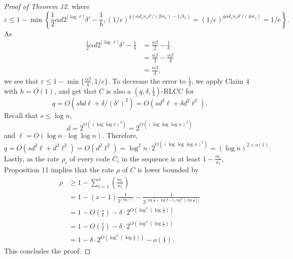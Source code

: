 \begin{proof}[Proof of Theorem 12]
where
\[\varepsilon\le1-\min\left\{\frac12\alpha d2^{\lceil\log\ell\rceil}\delta'-\frac1b,(1/e)^{g(\alpha d_s n_s\delta'/(2m_s)-1/b_s)}=(1/e)^{g\alpha d_s n_s\delta'/(4m_s)}=1/e\right\}.\]
As
\begin{align*}\frac12\alpha d2^{\lceil\log\ell\rceil}\delta'-\frac1b&=\frac{\alpha\beta}2-\frac1b\\&=\frac{\alpha\beta}2-\frac{\alpha\beta}4\\&=\frac{\alpha\beta}4,\end{align*}
we see that $\varepsilon\le1-\min\{\frac{\alpha\beta}4,1/e\}$. To decrease the error to $\frac13$, we apply Claim 4 with $h=O(1)$, and get that $C$ is also a $(q,\delta,\frac13)$-RLCC for
\[q=O(sbd\ell+\delta/(\delta')^2)=O(sd^2\ell+\delta d^2\ell^2).\]
Recall that $s\le\log n$,
\[d=2^{O((\log\log r)^3)}=2^{O((\log\log\log n)^3)}\]
and $\ell=O(\log n\cdot\log\log n)$. Therefore,
\[q=O(sd^2\ell+d^2\ell^2)=O(d^2\ell^2)=\log^2 n\cdot2^{O((\log\log\log n)^3)}=(\log n)^{2+o(1)}.\]
Lastly, as the rate $\rho_i$ of every code $C_i$ in the sequence is at least $1-\frac{m_i}{n_i}$, Proposition 11 implies that the rate $\rho$ of $C$ is lower bounded by
\begin{align*}\rho&\ge1-\sum_{i=1}^s\left(\frac{m_i}{n_i}\right)\\&=1-(s-1)\frac1{2^{\lceil\log\ell\rceil}}-\frac1{2^{\lfloor\log\frac1\delta+\log\beta-c_0\log^3(\log\frac1\delta)\rfloor}}\\&=1-O\left(\frac s\ell\right)-\delta\cdot2^{O(\log^3(\log\frac1\delta))}\\&=1-O\left(\frac r\ell\right)-\delta\cdot2^{O(\log^3(\log\frac1\delta))}\\&=1-\delta\cdot2^{O(\log^3(\log\frac1\delta))}-o(1).\end{align*}
This concludes the proof.
\end{proof}
